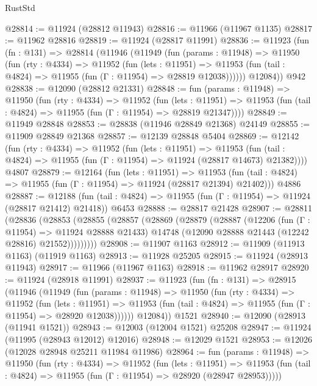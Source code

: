 \begin{lexlean}{RustStd}
\begin{coremodule}
@28814 := @11924 (@28812 @11943)
@28816 := @11966 (@11967 @1135)
@28817 := @11962 @28816
@28819 := @11924 (@28817 @11991)
@28836 := @11923
    (fun (fn : @131) =>
    @28814
      (@11946
        (@11949
          (fun (params : @11948) =>
          @11950
            (fun (rty : @4334) =>
            @11952
              (fun (lets : @11951) =>
              @11953 (fun (tail : @4824) => @11955 (fun (Γ : @11954) => @28819 @12038))))))
        @12084))
    @942
@28838 := @12090 (@28812 @21331)
@28848 := fun (params : @11948) =>
  @11950
    (fun (rty : @4334) =>
    @11952
      (fun (lets : @11951) =>
      @11953 (fun (tail : @4824) => @11955 (fun (Γ : @11954) => @28819 @21347))))
@28849 := @11949 @28848
@28853 := @28838 (@11946 @28849 @21368) @24149
@28855 := @11909 @28849 @21368
@28857 := @12139 @28848 @5404
@28869 := @12142
    (fun (rty : @4334) =>
    @11952
      (fun (lets : @11951) =>
      @11953 (fun (tail : @4824) => @11955 (fun (Γ : @11954) => @11924 (@28817 @14673) @21382))))
    @4807
@28879 := @12164
    (fun (lets : @11951) =>
    @11953 (fun (tail : @4824) => @11955 (fun (Γ : @11954) => @11924 (@28817 @21394) @21402)))
    @4886
@28887 := @12188
    (fun (tail : @4824) => @11955 (fun (Γ : @11954) => @11924 (@28817 @21412) @21418))
    @6453
@28888 := @28817 @21428
@28907 := @28811
    (@28836
      (@28853
        (@28855
          (@28857
            (@28869
              (@28879
                (@28887
                  (@12206
                    (fun (Γ : @11954) => @11924 @28888 @21433)
                    @14748
                    (@12090 @28888 @21443 (@12242 @28816) @21552)))))))))
@28908 := @11907 @1163
@28912 := @11909 (@11913 @1163) (@11919 @1163)
@28913 := @11928 @25205
@28915 := @11924 (@28913 @11943)
@28917 := @11966 (@11967 @1163)
@28918 := @11962 @28917
@28920 := @11924 (@28918 @11991)
@28937 := @11923
    (fun (fn : @131) =>
    @28915
      (@11946
        (@11949
          (fun (params : @11948) =>
          @11950
            (fun (rty : @4334) =>
            @11952
              (fun (lets : @11951) =>
              @11953 (fun (tail : @4824) => @11955 (fun (Γ : @11954) => @28920 @12038))))))
        @12084))
    @1521
@28940 := @12090 (@28913 (@11941 @1521))
@28943 := @12003 (@12004 @1521) @25208
@28947 := @11924 (@11995 (@28943 @12012) @12016)
@28948 := @12029 @1521
@28953 := @12026 (@12028 @28948 @25211 @11984 @11986)
@28964 := fun (params : @11948) =>
  @11950
    (fun (rty : @4334) =>
    @11952
      (fun (lets : @11951) =>
      @11953 (fun (tail : @4824) => @11955 (fun (Γ : @11954) => @28920 (@28947 @28953)))))

\end{coremodule}
\end{lexlean}
